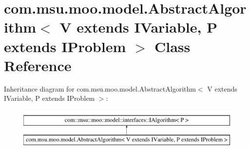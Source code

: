 \hypertarget{classcom_1_1msu_1_1moo_1_1model_1_1AbstractAlgorithm_3_01V_01extends_01IVariable_00_01P_01extends_01IProblem_01_4}{\section{com.\-msu.\-moo.\-model.\-Abstract\-Algorithm$<$ V extends I\-Variable, P extends I\-Problem $>$ Class Reference}
\label{classcom_1_1msu_1_1moo_1_1model_1_1AbstractAlgorithm_3_01V_01extends_01IVariable_00_01P_01extends_01IProblem_01_4}
}
Inheritance diagram for com.\-msu.\-moo.\-model.\-Abstract\-Algorithm$<$ V extends I\-Variable, P extends I\-Problem $>$\-:\begin{figure}[H]
\begin{center}
\leavevmode
\includegraphics[height=2.000000cm]{classcom_1_1msu_1_1moo_1_1model_1_1AbstractAlgorithm_3_01V_01extends_01IVariable_00_01P_01extends_01IProblem_01_4}
\end{center}
\end{figure}
